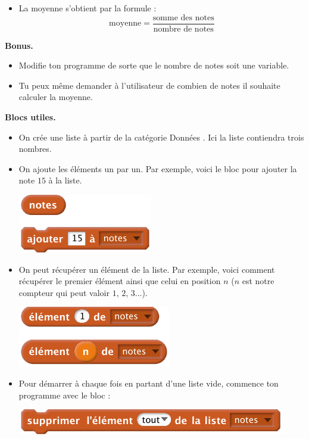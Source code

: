 \documentclass[class=report,crop=false, 12pt]{standalone}
\begin{document}
\begin{activite}
\begin{itemize}
  \item La moyenne s'obtient par la formule :
  $$\text{moyenne} = \frac{\text{somme des notes}}{\text{nombre de notes}}$$
\end{itemize}


\bigskip

\textbf{Bonus.}
\begin{itemize}
  \item Modifie ton programme de sorte que le nombre de notes soit une variable. 
  
  \item Tu peux même demander à l'utilisateur de combien de notes il souhaite calculer la moyenne.
  
\end{itemize}

\bigskip

\textbf{Blocs utiles.}

\begin{itemize}
  \item On crée une liste à partir de la catégorie \og Données \fg{}. Ici la liste  contiendra trois nombres.
  
 
  \item On ajoute les éléments un par un. Par exemple, voici le bloc pour ajouter la note $15$ à la liste.
 \begin{center}
  \includegraphics[scale=\scalebloc]{bloc-12-ex1a}
\end{center} 

  \item On peut récupérer un élément de la liste. Par exemple, voici comment récupérer le premier élément ainsi que celui en position $n$
  ($n$ est notre compteur qui peut valoir $1$, $2$, $3$...).
 \begin{center}
  \includegraphics[scale=\scalebloc]{bloc-12-ex1b}
\end{center}   
  \item Pour démarrer à chaque fois en partant d'une liste vide, commence ton programme avec le bloc :
 \begin{center}
  \includegraphics[scale=\scalebloc]{bloc-12-ex1c}
\end{center}   
  
\end{itemize}

  
\end{activite}
\end{document}
